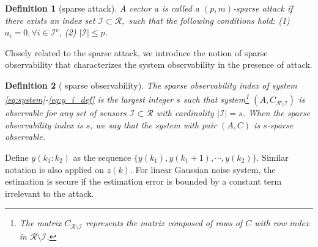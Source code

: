 \documentclass{ieeetrans}   %
\newcommand{\Cc}{{\mathcal{C}}}
\newcommand{\Ic}{{\mathcal{I}}}
\newcommand{\Rc}{{\mathcal{R}}}
\newtheorem{definition}{\textbf{Definition}}
\begin{document}
\begin{definition}[sparse attack]\label{def:attack}
	A vector $a$ is called a $(p, m)$-sparse attack if there exists an index set $\Ic \subset \mathcal{R},$ such that the following conditions hold:
	(1) $a_{i}=0, \forall i \in \Ic^{c} $, (2) $|\Ic| \leq p$. 
\end{definition}

Closely related to the sparse attack, we introduce the notion of sparse observability that characterizes the system observability in the presence of attack.

\begin{definition}[\hspace{-0.0001pt}\cite{ShoukryTAC2016} sparse observability]\label{df:sparse_obs}
	The sparse observability index of system \eqref{eq:system}-\eqref{eq:y_i_def} is the largest integer $s$ such that system\footnote{The matrix $C_{\Rc\setminus\Ic}$ represents the matrix composed of rows of $C$ with row index in $\Rc\setminus\Ic$.} $(A,C_{\Rc\setminus\Ic})$ is observable for any set of sensors $\Ic\subset\Rc$ with cardinality $|\Ic| = s$. When the sparse observability index is $s$, we say that the system with pair $(A,C)$ is $s$-sparse observable.
\end{definition}
Define $y(k_1:k_2)$ as the sequence $\{y(k_1),y(k_1+1),\cdots,y(k_2)\}$. Similar notation is also applied on $z(k)$.	
For linear Gaussian noise system, the estimation is secure if the estimation error is bounded by a constant term irrelevant to the attack. 
\end{document}
